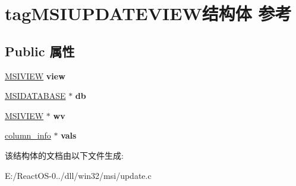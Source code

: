 \hypertarget{structtag_m_s_i_u_p_d_a_t_e_v_i_e_w}{}\section{tag\+M\+S\+I\+U\+P\+D\+A\+T\+E\+V\+I\+E\+W结构体 参考}
\label{structtag_m_s_i_u_p_d_a_t_e_v_i_e_w}
\subsection*{Public 属性}
\begin{DoxyCompactItemize}
\item 
\mbox{\label{structtag_m_s_i_u_p_d_a_t_e_v_i_e_w_a8b7be62bf8379fa59c754fcec8851b9f}} 
\hyperlink{structtag_m_s_i_v_i_e_w}{M\+S\+I\+V\+I\+EW} {\bfseries view}
\item 
\mbox{\label{structtag_m_s_i_u_p_d_a_t_e_v_i_e_w_a1910b5e1cff4506abc4c312958aa9f17}} 
\hyperlink{structtag_m_s_i_d_a_t_a_b_a_s_e}{M\+S\+I\+D\+A\+T\+A\+B\+A\+SE} $\ast$ {\bfseries db}
\item 
\mbox{\label{structtag_m_s_i_u_p_d_a_t_e_v_i_e_w_ac3b7694d6f229c4f2c69a3ed14e55e79}} 
\hyperlink{structtag_m_s_i_v_i_e_w}{M\+S\+I\+V\+I\+EW} $\ast$ {\bfseries wv}
\item 
\mbox{\label{structtag_m_s_i_u_p_d_a_t_e_v_i_e_w_aba02b6334a84fae9293ac860a382fa82}} 
\hyperlink{struct__column__info}{column\+\_\+info} $\ast$ {\bfseries vals}
\end{DoxyCompactItemize}


该结构体的文档由以下文件生成\+:\begin{DoxyCompactItemize}
\item 
E\+:/\+React\+O\+S-\/0../dll/win32/msi/update.\+c\end{DoxyCompactItemize}
